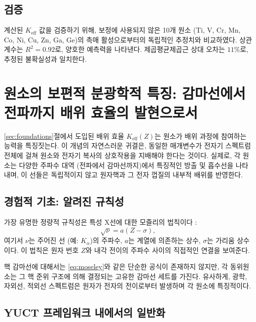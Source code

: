 \documentclass[12pt,a4paper]{article}
\newcommand{\Keff}{K_{\mathrm{eff}}}
\begin{document}
	\subsection{검증}
	
	계산된 $\Keff$ 값을 검증하기 위해, 보정에 사용되지 않은 10개 원소 (Ti, V, Cr, Mn, Co, Ni, Cu, Zn, Ga, Ge)의 촉매 활성으로부터의 독립적인 추정치와 비교하였다. 상관 계수는 $R^2 = 0.92$로, 양호한 예측력을 나타낸다. 제곱평균제곱근 상대 오차는 $11\%$로, 추정된 불확실성과 일치한다.
	
	\section{원소의 보편적 분광학적 특징: 감마선에서 전파까지 배위 효율의 발현으로서}
	\label{sec:spectral_signature}
	
	\ref{sec:foundations}절에서 도입된 배위 효율 \(K_{\mathrm{eff}}(Z)\)는 원소가 배위 과정에 참여하는 능력을 특징짓는다. 이 개념의 자연스러운 귀결은, 동일한 매개변수가 전자기 스펙트럼 전체에 걸쳐 원소와 전자기 복사의 상호작용을 지배해야 한다는 것이다. 실제로, 각 원소는 다양한 주파수 대역 (전파에서 감마선까지)에서 특징적인 방출 및 흡수선을 나타내며, 이 선들은 독립적이지 않고 원자핵과 그 전자 껍질의 내부적 배위를 반영한다.
	
	\subsection{경험적 기초: 알려진 규칙성}
	
	가장 유명한 정량적 규칙성은 특성 X선에 대한 모즐리의 법칙이다 \cite{Moseley1913}:
	\begin{equation}
		\sqrt{\nu} = a (Z - \sigma),
		\label{eq:moseley}
	\end{equation}
	여기서 \(\nu\)는 주어진 선 (예: \(K_\alpha\))의 주파수, \(a\)는 계열에 의존하는 상수, \(\sigma\)는 가리움 상수이다. 이 법칙은 원자 번호 \(Z\)와 내각 전이의 주파수 사이의 직접적인 연결을 보여준다.
	
	핵 감마선에 대해서는 \eqref{eq:moseley}와 같은 단순한 공식이 존재하지 않지만, 각 동위원소는 그 핵 준위 구조에 의해 결정되는 고유한 감마선 세트를 가진다. 유사하게, 광학, 자외선, 적외선 스펙트럼은 원자가 전자의 전이로부터 발생하며 각 원소에 특징적이다.
	
	\subsection{YUCT 프레임워크 내에서의 일반화}
	
\end{document}
